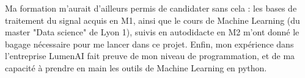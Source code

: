 \documentclass[a4paper,12pt]{article}
\begin{document}
%
Ma formation m'aurait d'ailleurs permis de candidater sans cela : les bases de traitement du signal acquis en M1, ainsi que le cours de Machine Learning (du master "Data science" de Lyon 1), suivis en autodidacte en M2 m'ont donné le bagage nécessaire pour me lancer dans ce projet. Enfin, mon expérience dans l'entreprise LumenAI fait preuve de mon niveau de programmation, et de ma capacité à prendre en main les outils de Machine Learning en python.\\
\end{document}
